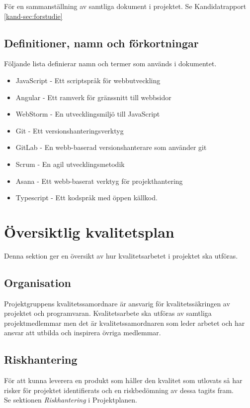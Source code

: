 \documentclass[a4paper,10pt]{article}
\begin{document}
För en sammanställning av samtliga dokument i projektet. Se Kandidatrapport \ref{kand-sec:forstudie}

\subsection{Definitioner, namn och förkortningar}
Följande lista definierar namn och termer som används i dokumentet.
\begin{itemize}
    \item JavaScript - Ett scriptspråk för webbutveckling
    \item Angular - Ett ramverk för gränssnitt till webbsidor
    \item WebStorm - En utvecklingsmiljö till JavaScript
    \item Git - Ett versionshanteringsverktyg
    \item GitLab - En webb-baserad versionshanterare som använder git
    \item Scrum - En agil utvecklingsmetodik
    \item Asana - Ett webb-baserat verktyg för projekthantering
    \item Typescript - Ett kodspråk med öppen källkod.
\end{itemize}

\section{Översiktlig kvalitetsplan}
Denna sektion ger en översikt av hur kvalitetsarbetet i projektet ska utföras.

\subsection{Organisation}

Projektgruppens kvalitetssamordnare är ansvarig för kvalitetssäkringen av projektet och  programvaran. Kvalitetsarbete ska utföras av samtliga projektmedlemmar men det är kvalitetssamordnaren som leder arbetet och har ansvar att utbilda och inspirera övriga medlemmar.

\subsection{Riskhantering}

För att kunna leverera en produkt som håller den kvalitet som utlovats så har risker för projektet identifierats och en riskbedömning av dessa tagits fram. \\
Se sektionen \emph{Riskhantering} i Projektplanen.
\end{document}
